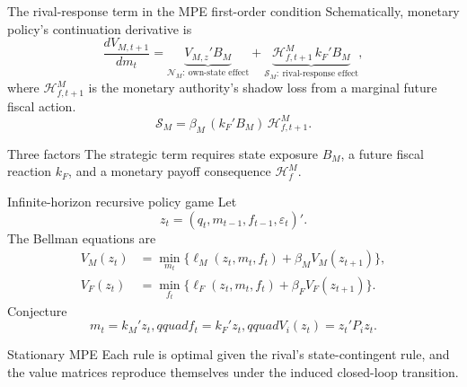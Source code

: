 \documentclass[10pt,aspectratio=169]{beamer}
\begin{document}
\begin{frame}{The rival-response term in the MPE first-order condition}
Schematically, monetary policy's continuation derivative is
\begin{equation*}
\frac{dV_{M,t+1}}{dm_t}
=\underbrace{V_{M,z}'B_M}_{\mathcal N_M:\ \text{own-state effect}}
+\underbrace{\mathcal H^M_{f,t+1}\,k_F'B_M}_{\mathcal S_M:\ \text{rival-response effect}},
\end{equation*}
where $\mathcal H^M_{f,t+1}$ is the monetary authority's shadow loss from a
marginal future fiscal action.
\vspace{0.3cm}
\begin{equation*}
\boxed{\mathcal S_M
=\beta_M\,(k_F'B_M)\,\mathcal H^M_{f,t+1}.}
\end{equation*}
\begin{alertblock}{Three factors}
The strategic term requires state exposure $B_M$, a future fiscal reaction
$k_F$, and a monetary payoff consequence $\mathcal H^M_f$.
\end{alertblock}
\end{frame}

\begin{frame}{Infinite-horizon recursive policy game}
Let
\begin{equation*}
z_t=(q_t,m_{t-1},f_{t-1},\varepsilon_t)'.
\end{equation*}
The Bellman equations are
\begin{align*}
V_M(z_t)&=\min_{m_t}\{\ell_M(z_t,m_t,f_t)+\beta_MV_M(z_{t+1})\},\\
V_F(z_t)&=\min_{f_t}\{\ell_F(z_t,m_t,f_t)+\beta_FV_F(z_{t+1})\}.
\end{align*}
Conjecture
\begin{equation*}
m_t=k_M'z_t,qquad f_t=k_F'z_t,qquad V_i(z_t)=z_t'P_iz_t.
\end{equation*}
\begin{block}{Stationary MPE}
Each rule is optimal given the rival's state-contingent rule, and the value
matrices reproduce themselves under the induced closed-loop transition.
\end{block}
\end{frame}
\end{document}
